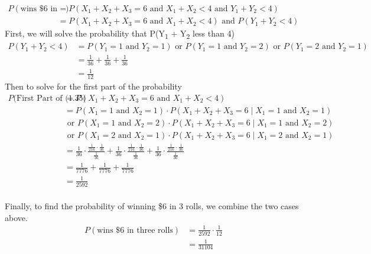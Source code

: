 \documentclass{article}
\numberwithin{equation}{section}
\newcommand{\A}{\text{ and }}
\newcommand{\R}{\text{ or }}
\newcommand{\eqname}[1]{\tag*{#1}}%
\begin{document}
\begin{align}
        \label{P(Win 6 3 Roll EQ)}
        P(\text{wins \$6 in three rolls}) &= P(X_1 + X_2 + X_3 = 6 \A X_1 + X_2 < 4 \A Y_1 + Y_2 < 4) \eqname{} \\
        &= P(X_1 + X_2 + X_3 = 6 \A X_1 + X_2 < 4) \A P(Y_1 + Y_2 < 4)
\end{align}
First, we will solve the probability that P(Y\textsubscript{1} + Y\textsubscript{2} less than 4)
\begin{align}
        \label{P(Y_1 + Y_2 < 4)}
            P(Y_1 + Y_2 < 4) &= P(Y_1 = 1 \A Y_2 = 1) \R P(Y_1 = 1 \A Y_2 = 2) \R P(Y_1 = 2 \A Y_2 = 1) \eqname{} \\
            &= \frac{1}{36} + \frac{1}{36} + \frac{1}{36} \eqname{} \\
            &= \frac{1}{12}
\end{align}
Then to solve for the first part of the probability
\begin{align}
    \label{P(Win 6 3 Roll 1st part)}
        P(\text{First Part of } \text{(1.35)} &= P(X_1 + X_2 + X_3 = 6 \A X_1 + X_2 < 4) \eqname{} \\
        &= P(X_1 = 1 \A X_2 = 1) \cdot P(X_1 + X_2 + X_3 = 6 \mid X_1 = 1 \A X_2 = 1) \eqname{} \\
        & \R P(X_1 = 1 \A X_2 = 2) \cdot P(X_1 + X_2 + X_3 = 6 \mid X_1 = 1 \A X_2 = 2) \eqname{} \\
        & \R P(X_1 = 2 \A X_2 = 1) \cdot P(X_1 + X_2 + X_3 = 6 \mid X_1 = 2 \A X_2 = 1) \eqname{} \\
        &= \frac{1}{36} \cdot \frac{\frac{1}{216} \cdot \frac{1}{36}}{\frac{1}{36}} + \frac{1}{36} \cdot \frac{\frac{1}{216} \cdot \frac{1}{36}}{\frac{1}{36}} + \frac{1}{36} \cdot \frac{\frac{1}{216} \cdot \frac{1}{36}}{\frac{1}{36}} \eqname{} \\
        &= \frac{1}{7776} + \frac{1}{7776} + \frac{1}{7776} \eqname{} \\
        &= \frac{1}{2592} \eqname{} \\
\end{align}

Finally, to find the probability of winning \$6 in 3 rolls, we combine the two cases above.
\begin{align}
        \label{P(Win 6 3 Roll Total)}
        P(\text{wins \$6 in three rolls}) &= \frac{1}{2592} \cdot \frac{1}{12} \eqname{} \\
        &= \frac{1}{31104}
\end{align}
\end{document}
